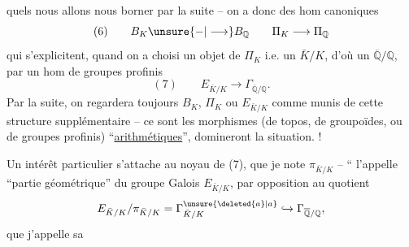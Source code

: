 quels nous allons nous borner par la suite -- on a donc des hom canoniques
\[
(6)\qquad B_K\unsure{-|\longrightarrow}B_{\mathbb Q}\qquad\Pi_K\longrightarrow\Pi_{\mathbb Q}
\]
qui s'explicitent, quand on a choisi un objet de $\Pi_K$ i.e. un $\bar K/K$, d'où un $\overline{\mathbb Q}/\mathbb Q$, par un hom de groupes profinis
\[
(7)\qquad E_{\bar K/K}\longrightarrow\Gamma_{\overline{\mathbb Q}/\mathbb Q}.
\]
Par la suite, on regardera toujours $B_K$, $\Pi_K$ ou $E_{\bar K/K}$ comme munis de cette structure supplémentaire -- ce sont les morphismes (de topos, de groupoïdes, ou de groupes profinis) ``\uline{arithmétiques}'', domineront la situation. !

Un intérêt particulier s'attache au noyau de (7), que je note $\pi_{\bar K/K}$ -- `` l'appelle ``partie géométrique'' du groupe Galois $E_{\bar K/K}$, par opposition au quotient
\[
E_{\bar K/K}/\pi_{\bar K/K}=\Gamma^{\unsure{\deleted{a}|a}}_{\bar K/K}\hookrightarrow\Gamma_{\overline{\mathbb Q}/\mathbb Q},
\]
que j'appelle sa
